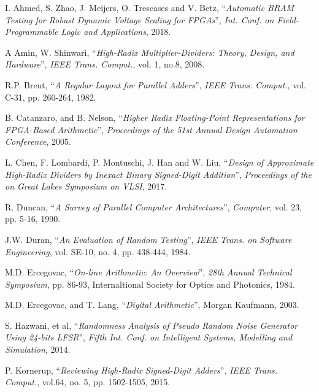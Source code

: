 \begin{thebibliography}{1}

  I. Ahmed, S. Zhao, J. Meijers, O. Trescases and V. Betz,
  ``\textit{Automatic BRAM Testing for Robust Dynamic Voltage Scaling for
  FPGAs}'',
  \textit{Int. Conf. on Field-Programmable Logic and Applications},
  2018.

  A Amin, W. Shinwari,
  ``\textit{High-Radix Multiplier-Dividers: Theory, Design, and Hardware}'',
  \textit{IEEE Trans. Comput.}, vol. 1, no.8,
  2008.

  R.P. Brent,
  ``\textit{A Regular Layout for Parallel Adders}'',
  \textit{IEEE Trans. Comput.}, vol. C-31, pp. 260-264,
  1982.

  B. Catanzaro, and B. Nelson,
  ``\textit{Higher Radix Floating-Point Representations for FPGA-Based
  Arithmetic}'',
  \textit{Proceedings of the 51st Annual Design Automation Conference},
  2005.

  L. Chen, F. Lombardi, P. Montuschi, J. Han and W. Liu,
  ``\textit{Design of Approximate High-Radix Dividers by Inexact Binary
  Signed-Digit Addition}'',
  \textit{Proceedings of the on Great Lakes Symposium on VLSI},
  2017.

  R. Duncan,
  ``\textit{A Survey of Parallel Computer Architectures}'',
  \textit{Computer}, vol. 23, pp. 5-16,
  1990.

  J.W. Duran,
  ``\textit{An Evaluation of Random Testing}'',
  \textit{IEEE Trans. on Software Engineering}, vol. SE-10, no. 4, pp. 438-444,
  1984.

  M.D. Ercegovac,
  ``\textit{On-line Arithmetic: An Overview}'',
  \textit{28th Annual Technical Symposium}, pp. 86-93,
  Internaltional Society for Optics and Photonics,
  1984.

  M.D. Ercegovac, and T. Lang,
  ``\textit{Digital Arithmetic}'',
  Morgan Kaufmann,
  2003.

  S. Hazwani, et al,
  ``\textit{Randomness Analysis of Pseudo Random Noise Generator Using 24-bits
  LFSR}'',
  \textit{Fifth Int. Conf. on Intelligent Systems, Modelling and Simulation},
  2014.

  P. Kornerup,
  ``\textit{Reviewing High-Radix Signed-Digit Adders}'',
  \textit{IEEE Trans. Comput.}, vol.64, no. 5, pp. 1502-1505,
  2015.


\end{thebibliography}
